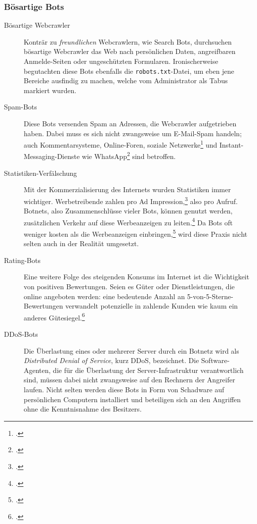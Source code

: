 \subsubsection{Bösartige Bots}
\label{ssub:boesartige-bots}

\begin{description}
  \item[Bösartige Webcrawler]
  Konträr zu \emph{freundlichen} Webcrawlern, wie Search Bots, durchsuchen
  bösartige Webcrawler das Web nach persönlichen Daten, angreifbaren
  Anmelde-Seiten oder ungeschützten Formularen. Ironischerweise begutachten
  diese Bots ebenfalls die \texttt{robots.txt}-Datei, um eben jene Bereiche
  ausfindig zu machen, welche vom Administrator als Tabus markiert wurden.
  
  \item[Spam-Bots]
  Diese Bots versenden Spam an Adressen, die Webcrawler aufgetrieben haben.
  Dabei muss es sich nicht zwangsweise um E-Mail-Spam handeln; auch
  Kommentarsysteme, Online-Foren, soziale Netzwerke\footcite{facebookSpamBiz}
  und Instant-Messaging-Dienste wie WhatsApp\footcite{whatsappSpamSperre} sind
  betroffen.
  
  \item[Statistiken-Verfälschung]
  Mit der Kommerzialisierung des Internets wurden Statistiken immer wichtiger.
  Werbetreibende zahlen pro Ad Impression,\footcite{wp:adImpression} also pro
  Aufruf. Botnets, also Zusammenschlüsse vieler Bots, können genutzt werden,
  zusätzlichen Verkehr auf diese Werbeanzeigen zu
  leiten.\footcite{fakeTrafficPayday} Da Bots oft weniger kosten als die
  Werbeanzeigen einbringen,\footcite{fakeTrafficPayday} wird diese Praxis nicht
  selten auch in der Realität umgesetzt.
  
  \item[Rating-Bots]
  Eine weitere Folge des steigenden Konsums im Internet ist die Wichtigkeit von
  positiven Bewertungen. Seien es Güter oder Dienstleistungen, die online
  angeboten werden: eine bedeutende Anzahl an 5-von-5-Sterne-Bewertungen
  verwandelt potenzielle in zahlende Kunden wie kaum ein anderes
  Gütesiegel.\footcite{consumersInfluencedReviews}
  
  \item[DDoS-Bots]
  Die Überlastung eines oder mehrerer Server durch ein Botnetz wird als
  \emph{Distributed Denial of Service}, kurz DDoS, bezeichnet. Die
  Software-Agenten, die für die Überlastung der Server-Infrastruktur
  verantwortlich sind, müssen dabei nicht zwangsweise auf den Rechnern der
  Angreifer laufen. Nicht selten werden diese Bots in Form von Schadware auf
  persönlichen Computern installiert und beteiligen sich an den Angriffen ohne
  die Kenntnisnahme des Besitzers.
\end{description}
